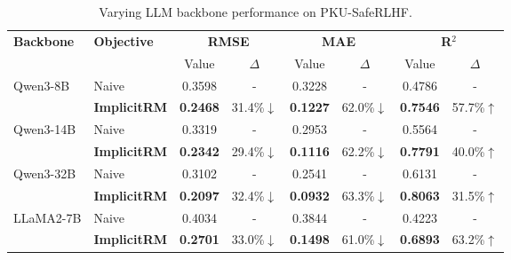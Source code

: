 \documentclass[]{arxiv_singlecolumn}
\theoremstyle{plain}
\theoremstyle{definition}
\theoremstyle{remark}
\begin{document}
\begin{table}[t]
\centering
\scriptsize
\setlength\tabcolsep{16pt} %
\renewcommand{\arraystretch}{1} %
\caption{Varying LLM backbone performance on PKU-SafeRLHF.}
\label{tab:generalization}
\begin{tabular}{l l cc cc cc}
\toprule
\multirow{2}{*}[-0.5ex]{\textbf{Backbone}} & \multirow{2}{*}[-0.5ex]{\textbf{Objective}} & \multicolumn{2}{c}{\textbf{RMSE}} & \multicolumn{2}{c}{\textbf{MAE}} & \multicolumn{2}{c}{\textbf{R$^2$}} \\
\cmidrule(lr){3-4} \cmidrule(lr){5-6} \cmidrule(lr){7-8}
& & Value & $\Delta$ & Value & $\Delta$ & Value & $\Delta$ \\
\midrule

\multirow{2}{*}{Qwen3-8B} 
& Naive & 0.3598 & - & 0.3228 & - & 0.4786 & - \\
& \cellcolor[HTML]{ecf0ff}\textbf{ImplicitRM} & \cellcolor[HTML]{ecf0ff}\textbf{0.2468} & \cellcolor[HTML]{ecf0ff}31.4\%$\downarrow$ & \cellcolor[HTML]{ecf0ff}\textbf{0.1227} & \cellcolor[HTML]{ecf0ff}62.0\%$\downarrow$ & \cellcolor[HTML]{ecf0ff}\textbf{0.7546} & \cellcolor[HTML]{ecf0ff}57.7\%$\uparrow$ \\
\cmidrule{1-8}

\multirow{2}{*}{Qwen3-14B} 
& Naive & 0.3319 & - & 0.2953 & - & 0.5564 & - \\
& \cellcolor[HTML]{ecf0ff}\textbf{ImplicitRM} & \cellcolor[HTML]{ecf0ff}\textbf{0.2342} & \cellcolor[HTML]{ecf0ff}29.4\%$\downarrow$ & \cellcolor[HTML]{ecf0ff}\textbf{0.1116} & \cellcolor[HTML]{ecf0ff}62.2\%$\downarrow$ & \cellcolor[HTML]{ecf0ff}\textbf{0.7791} & \cellcolor[HTML]{ecf0ff}40.0\%$\uparrow$ \\
\cmidrule{1-8}

\multirow{2}{*}{Qwen3-32B} 
& Naive & 0.3102 & - & 0.2541 & - & 0.6131 & - \\
& \cellcolor[HTML]{ecf0ff}\textbf{ImplicitRM} & \cellcolor[HTML]{ecf0ff}\textbf{0.2097} & \cellcolor[HTML]{ecf0ff}32.4\%$\downarrow$ & \cellcolor[HTML]{ecf0ff}\textbf{0.0932} & \cellcolor[HTML]{ecf0ff}63.3\%$\downarrow$ & \cellcolor[HTML]{ecf0ff}\textbf{0.8063} & \cellcolor[HTML]{ecf0ff}31.5\%$\uparrow$ \\
\cmidrule{1-8}

\multirow{2}{*}{LLaMA2-7B} 
& Naive & 0.4034 & - & 0.3844 & - & 0.4223 & - \\
& \cellcolor[HTML]{ecf0ff}\textbf{ImplicitRM} & \cellcolor[HTML]{ecf0ff}\textbf{0.2701} & \cellcolor[HTML]{ecf0ff}33.0\%$\downarrow$ & \cellcolor[HTML]{ecf0ff}\textbf{0.1498} & \cellcolor[HTML]{ecf0ff}61.0\%$\downarrow$ & \cellcolor[HTML]{ecf0ff}\textbf{0.6893} & \cellcolor[HTML]{ecf0ff}63.2\%$\uparrow$ \\
\cmidrule{1-8}


\end{tabular}
\end{table}
\end{document}
